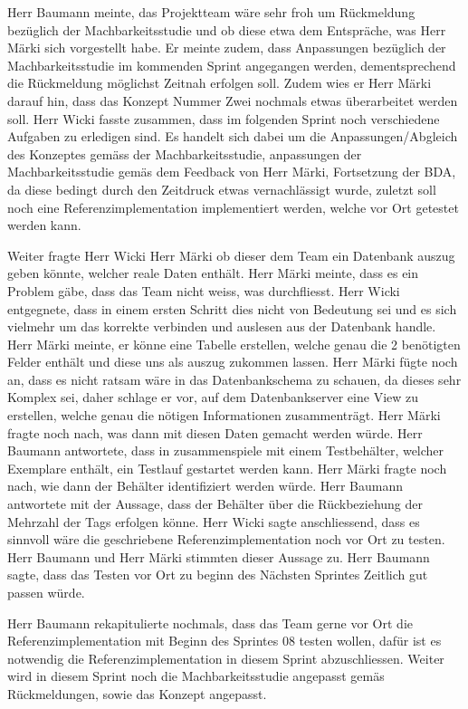 \documentclass[parskip=full, a4paper]{scrreprt}
\begin{document}
Herr Baumann meinte, das Projektteam wäre sehr froh um Rückmeldung bezüglich der Machbarkeitsstudie und ob diese etwa dem Entspräche, was Herr Märki sich vorgestellt habe. Er meinte zudem, dass Anpassungen bezüglich der Machbarkeitsstudie im kommenden Sprint angegangen werden, dementsprechend die Rückmeldung möglichst Zeitnah erfolgen soll.
Zudem wies er Herr Märki darauf hin, dass das Konzept Nummer Zwei nochmals etwas überarbeitet werden soll.
Herr Wicki fasste zusammen, dass im folgenden Sprint noch verschiedene Aufgaben zu erledigen sind. Es handelt sich dabei um die Anpassungen/Abgleich des Konzeptes gemäss der Machbarkeitsstudie, anpassungen der Machbarkeitsstudie gemäs dem Feedback von Herr Märki, Fortsetzung der BDA, da diese bedingt durch den Zeitdruck etwas vernachlässigt wurde, zuletzt soll noch eine Referenzimplementation implementiert werden, welche vor Ort getestet werden kann.

Weiter fragte Herr Wicki Herr Märki ob dieser dem Team ein Datenbank auszug geben könnte, welcher reale Daten enthält. Herr Märki meinte, dass es ein Problem gäbe, dass das Team nicht weiss, was durchfliesst. Herr Wicki entgegnete, dass in einem ersten Schritt dies nicht von Bedeutung sei und es sich vielmehr um das korrekte verbinden und auslesen aus der Datenbank handle. Herr Märki meinte, er könne eine Tabelle erstellen, welche genau die 2 benötigten Felder enthält und diese uns als auszug zukommen lassen. Herr Märki fügte noch an, dass es nicht ratsam wäre in das Datenbankschema zu schauen, da dieses sehr Komplex sei, daher schlage er vor, auf dem Datenbankserver eine View zu erstellen, welche genau die nötigen Informationen zusammenträgt. Herr Märki fragte noch nach, was dann mit diesen Daten gemacht werden würde. Herr Baumann antwortete, dass in zusammenspiele mit einem Testbehälter, welcher Exemplare enthält, ein Testlauf gestartet werden kann. Herr Märki fragte noch nach, wie dann der Behälter identifiziert werden würde. Herr Baumann antwortete mit der Aussage, dass der Behälter über die Rückbeziehung der Mehrzahl der Tags erfolgen könne. Herr Wicki sagte anschliessend, dass es sinnvoll wäre die geschriebene Referenzimplementation noch vor Ort zu testen. Herr Baumann und Herr Märki stimmten dieser Aussage zu. Herr Baumann sagte, dass das Testen vor Ort zu beginn des Nächsten Sprintes Zeitlich gut passen würde. 

Herr Baumann rekapitulierte nochmals, dass das Team gerne vor Ort die Referenzimplementation mit Beginn des Sprintes 08 testen wollen, dafür ist es notwendig die Referenzimplementation in diesem Sprint abzuschliessen. Weiter wird in diesem Sprint noch die Machbarkeitsstudie angepasst gemäs Rückmeldungen, sowie das Konzept angepasst.
\end{document}
